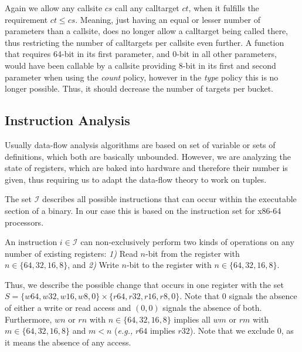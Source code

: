 Again we allow any callsite $cs$ call any calltarget $ct$, when it fulfills the requirement $ct \leq cs$. 
Meaning, just having an equal or lesser number of parameters than a callsite, does no longer allow a calltarget being called there, thus restricting the number of calltargets per 
callsite even further. A function that requires 64-bit in its first parameter, and 0-bit in all other parameters, would have been callable by a callsite providing 8-bit 
in its first and second parameter when using the \emph{count} policy, however in the \emph{type} policy this is no longer possible. Thus, it should decrease the number of targets per bucket.


\subsection{Instruction Analysis}
\label{section:instructionanalysis}
Usually data-flow analysis algorithms are based on set of variable or sets of definitions, which both are basically unbounded. However, we are analyzing the state of registers, which are baked into hardware and therefore their number is given, thus requiring us to adapt the data-flow theory to work on tuples.

The set $\mathcal{I}$ describes all possible instructions that can occur within the executable section of a binary. In our case this is based on the instruction set for x86-64 processors.

An instruction $i \in \mathcal{I}$ can non-exclusively perform two kinds of operations on any number of existing registers:
\textit{1)} Read $n$-bit from the register with $n \in \{ 64, 32, 16, 8 \}$, and
\textit{2)} Write $n$-bit to the register with $n \in \{ 64, 32, 16, 8 \}$.

Thus, we describe the possible change that occurs in one register with the set $S = \{ w64, w32, w16, w8, 0 \} \times \{r64, r32, r16, r8, 0 \}$. Note that 0 signals the absence of either a write or read access and $(0, 0)$ signals the absence of both. Furthermore, $wn$ or $rn$ with $n \in \{64,32,16,8\}$ implies all $wm$ or $rm$ with $m \in \{64,32,16,8\}$ and $m < n$ (\textit{e.g.,} $r64$ implies $r32$). Note that we exclude 0, as it means the absence of any access.

